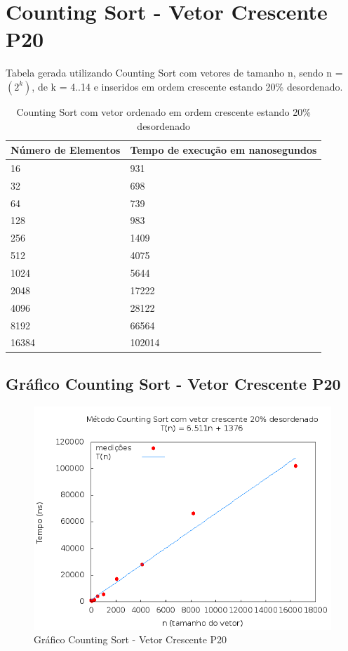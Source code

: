\documentclass[12pt,a4paper,twoside]{report}
\begin{document}
\section{Counting Sort - Vetor Crescente P20}
Tabela gerada utilizando Counting Sort com vetores de tamanho n, sendo n = $(2^k)$, de k = 4..14 e inseridos em ordem crescente estando 20\% desordenado.
\begin{table}[H]
\centering
\caption{Counting Sort com vetor ordenado em ordem crescente estando 20\% desordenado}
\label{my-label}
\begin{tabular}{|l|l|}
\hline
\multicolumn{1}{|c|}{\textbf{Número de Elementos}} & \multicolumn{1}{c|}{\textbf{Tempo de execução em nanosegundos}} \\ \hline
16 & 931 \\ \hline
32 & 698 \\ \hline
64 & 739 \\ \hline
128 & 983 \\ \hline
256 & 1409 \\ \hline
512 & 4075 \\ \hline
1024 & 5644 \\ \hline
2048 & 17222 \\ \hline
4096 & 28122 \\ \hline
8192 & 66564 \\ \hline
16384 & 102014 \\ \hline
\end{tabular}
\end{table}

\subsection{Gráfico Counting Sort - Vetor Crescente P20}
\begin{figure}[H]
    \centering
    \includegraphics[width=0.7\linewidth]{graficos/CountingSort/vIntCrescenteP20/vIntCrescenteP20.png}
  \caption{Gráfico Counting Sort - Vetor Crescente P20}
\end{figure}
\end{document}
